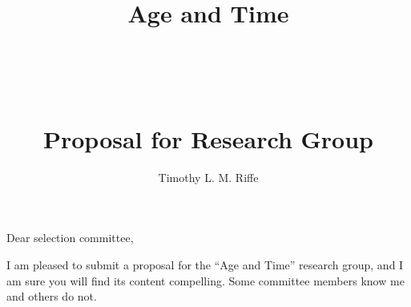 \documentclass[a4paper,12pt]{article}
\begin{document}
\title{\vspace{-15mm}
\fontsize{25pt}{10pt}\selectfont
\textbf{
\hfill
\Huge{Age} \huge{and} \Huge{Time} \hfill\hfill 
} \\ ~ \\~ \\~ \\ \huge{Proposal for Research Group}}
\author{Timothy L. M. Riffe}
\maketitle

Dear selection committee,

I am pleased to submit a proposal for the ``Age and Time'' research group, and I
am sure you will find its content compelling. Some committee members know me and
others do not. 
\end{document}
